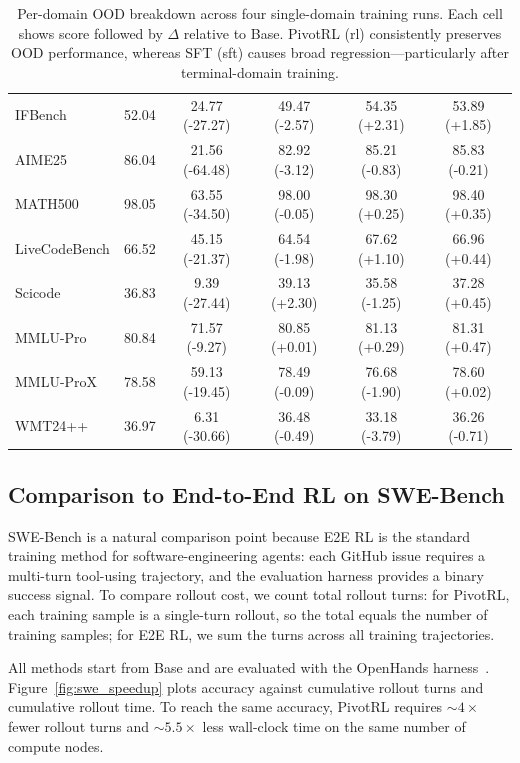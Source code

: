 \begin{table}[t]
\begin{tabular}{l c cc cc}
IFBench    & 52.04
  & 24.77 (-27.27) & 49.47 (-2.57)
  & 54.35 (+2.31)  & 53.89 (+1.85) \\
AIME25     & 86.04
  & 21.56 (-64.48) & 82.92 (-3.12)
  & 85.21 (-0.83)  & 85.83 (-0.21) \\
MATH500    & 98.05
  & 63.55 (-34.50) & 98.00 (-0.05)
  & 98.30 (+0.25)  & 98.40 (+0.35) \\
LiveCodeBench & 66.52
  & 45.15 (-21.37) & 64.54 (-1.98)
  & 67.62 (+1.10)  & 66.96 (+0.44) \\
Scicode    & 36.83
  & 9.39 (-27.44)  & 39.13 (+2.30)
  & 35.58 (-1.25)  & 37.28 (+0.45) \\
MMLU-Pro   & 80.84
  & 71.57 (-9.27)  & 80.85 (+0.01)
  & 81.13 (+0.29)  & 81.31 (+0.47) \\
MMLU-ProX  & 78.58
  & 59.13 (-19.45) & 78.49 (-0.09)
  & 76.68 (-1.90)  & 78.60 (+0.02) \\
WMT24++    & 36.97
  & 6.31 (-30.66)  & 36.48 (-0.49)
  & 33.18 (-3.79)  & 36.26 (-0.71) \\

\bottomrule
\end{tabular}
\caption{
Per-domain OOD breakdown across four single-domain training runs. Each cell shows score followed by $\Delta$ relative to Base. PivotRL (rl) consistently preserves OOD performance, whereas SFT (sft) causes broad regression---particularly after terminal-domain training.
}
\label{tab:single_domain_ood_full}
\end{table}



\subsection{Comparison to End-to-End RL on SWE-Bench}
\label{sec:swe_e2e}

SWE-Bench is a natural comparison point because E2E RL is the standard training method for software-engineering agents: each GitHub issue requires a multi-turn tool-using trajectory, and the evaluation harness provides a binary success signal. To compare rollout cost, we count total rollout turns: for PivotRL, each training sample is a single-turn rollout, so the total equals the number of training samples; for E2E RL, we sum the turns across all training trajectories.

All methods start from Base and are evaluated with the OpenHands harness~\citep{wang2025openhandsopenplatformai}. Figure~\ref{fig:swe_speedup} plots accuracy against cumulative rollout turns and cumulative rollout time. To reach the same accuracy, PivotRL requires ${\sim}4\times$ fewer rollout turns and ${\sim}5.5\times$ less wall-clock time on the same number of compute nodes.

